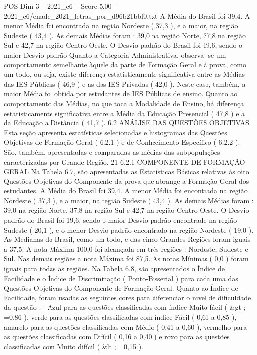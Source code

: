 \begin{textsample}{POS Dim 3 – 2021\_c6 – Score 5.00 – 2021\_c6/enade\_2021\_letras\_por\_d96b21bbf0.txt}
A Média do Brasil foi 39,4.
A menor Média foi encontrada na região Nordeste ( 37,3 ), e a maior, na região Sudeste ( 43,4 ).
As demais Médias foram : 39,0 na região Norte, 37,8 na região Sul e 42,7 na região Centro-Oeste.
O Desvio padrão do Brasil foi 19,6, sendo o maior Desvio padrão Quanto a Categoria Administrativa, observa -se um comportamento semelhante àquele da parte de Formação Geral e à prova, como um todo, ou seja, existe diferença estatisticamente significativa entre as Médias das IES Públicas ( 46,9 ) e as das IES Privadas ( 42,0 ).
Neste caso, também, a maior Média foi obtida por estudantes de IES Públicas de ensino.
Quanto ao comportamento das Médias, no que toca a Modalidade de Ensino, há diferença estatisticamente significativa entre a Média da Educação Presencial ( 47,8 ) e a da Educação a Distância ( 41,7 ). 6.2 ANÁLISE DAS QUESTÕES OBJETIVAS Esta seção apresenta estatísticas selecionadas e histogramas das Questões Objetivas de Formação Geral ( 6.2.1 ) e de Conhecimento Específico ( 6.2.2 ).
São, também, apresentadas e comparadas as médias das subpopulações caracterizadas por Grande Região. 21 6.2.1 COMPONENTE DE FORMAÇÃO GERAL Na Tabela 6.7, são apresentadas as Estatísticas Básicas relativas às oito Questões Objetivas do Componente da prova que abrange a Formação Geral dos estudantes.
A Média do Brasil foi 39,4.
A menor Média foi encontrada na região Nordeste ( 37,3 ), e a maior, na região Sudeste ( 43,4 ).
As demais Médias foram : 39,0 na região Norte, 37,8 na região Sul e 42,7 na região Centro-Oeste.
O Desvio padrão do Brasil foi 19,6, sendo o maior Desvio padrão encontrado na região Sudeste ( 20,1 ), e o menor Desvio padrão encontrado na região Nordeste ( 19,0 ).
As Medianas do Brasil, como um todo, e das cinco Grandes Regiões foram iguais a 37,5.
A nota Máxima 100,0 foi alcançada em três regiões : Nordeste, Sudeste e Sul.
Nas demais regiões a nota Máxima foi 87,5.
As notas Mínimas ( 0,0 ) foram iguais para todas as regiões.
Na Tabela 6.8, são apresentados o Índice de Facilidade e o Índice de Discriminação ( Ponto-Bisserial ) para cada uma das Questões Objetivas do Componente de Formação Geral.
Quanto ao Índice de Facilidade, foram usadas as seguintes cores para diferenciar o nível de dificuldade da questão :  Azul para as questões classificadas com índice Muito fácil ( \&gt ; =0,86 ), verde para as questões classificadas com índice Fácil ( 0,61 a 0,85 ), amarelo para as questões classificadas com Médio ( 0,41 a 0,60 ), vermelho para as questões classificadas com Difícil ( 0,16 a 0,40 ) e roxo para as questões classificadas com Muito difícil ( \&lt ; =0,15 ).

\end{textsample}
